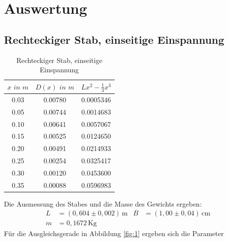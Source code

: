 


  \section{Auswertung}
  \subsection{Rechteckiger Stab, einseitige Einspannung}
  \begin{table}
    \centering
    \caption{Rechteckiger Stab, einseitige Einspannung}
    \label{tab:data2}
    \begin{tabular}{c c c  }
      \toprule $x \, \,  in \,\, m$ & $D(x) \,\, in \,\,  m$ & $Lx^2-\frac{1}{3}x^3$\\
      \midrule
      0.03 & 0.00780 & 0.0005346\\
      0.05 & 0.00744 & 0.0014683\\
      0.10 & 0.00641 & 0.0057067\\
      0.15 & 0.00525 & 0.0124650\\
      0.20 & 0.00491 & 0.0214933\\
      0.25 & 0.00254 & 0.0325417\\
      0.30 & 0.00120 & 0.0453600\\
      0.35 & 0.00088 & 0.0596983\\
      \bottomrule
    \end{tabular}
  \end{table}
  Die Ausmessung des Stabes und die Masse des Gewichts ergeben:
  \begin{align}
    L &= (0,604 \pm 0,002) \, \mathrm{m} & B &= (1,00 \pm 0,04) \, \mathrm{cm} \\
    m &= 0,1672 \, \mathrm{Kg} \label{eqn:2}
  \end{align}
Für die Ausgleichsgerade in Abbildung \ref{fig:1} ergeben sich die Parameter

